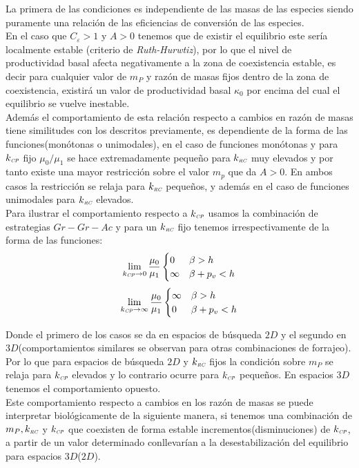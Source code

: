 La primera de las condiciones es independiente de las masas de las especies siendo puramente una relaci\'on de las eficiencias de conversi\'on de las especies. \\
En el caso que $C_\varepsilon > 1 $ y $ A  > 0$ tenemos que de existir el equilibrio este ser\'ia localmente estable (criterio de \emph{Ruth-Hurwtiz}), por lo que el nivel de productividad basal afecta negativamente a la zona de coexistencia estable, es decir para cualquier valor de $m_P$ y raz\'on de masas fijos dentro de la zona de coexistencia, existir\'a un valor de productividad basal $\kappa_0$ por encima del cual el equilibrio se vuelve inestable.\\
Adem\'as el comportamiento de esta relaci\'on respecto a cambios en raz\'on de masas tiene similitudes con los descritos previamente, es dependiente de la forma de las funciones(mon\'otonas o unimodales), en el caso de funciones mon\'otonas y para $k_{\textit{\tiny CP}}$ fijo $\mu_0/\mu_1$ se hace extremadamente peque\~no para $k_{\textit{\tiny RC}}$ muy elevados y por tanto existe una mayor restricci\'on sobre el valor $m_p$ que da $A>0$. En ambos casos la restricci\'on se relaja para $k_{\textit{\tiny RC}}$ peque\~nos, y adem\'as en el caso de funciones unimodales para $k_{\textit{\tiny RC}}$ elevados.\\
Para ilustrar el comportamiento respecto a $k_{\textit{\tiny CP}}$ usamos la combinaci\'on de estrategias $Gr-Gr-Ac$ y para un $k_{\textit{\tiny RC}}$ fijo tenemos irrespectivamente de la forma de las funciones:
\begin{equation}
      \lim_{k_{\textit{\tiny CP}} \to 0} \frac{\mu_0}{\mu_1} 
  \begin{cases}
     0 & \beta > h \\
     \infty & \beta + p_v < h\\ 
  \end{cases}
\end{equation}
\begin{equation}
  \lim_{k_{\textit{\tiny CP}} \to \infty} \frac{\mu_0}{\mu_1}
  \begin{cases}
    \infty & \beta > h\\ 
    0 & \beta + p_v < h\\
    \end{cases}
\end{equation}

Donde el primero de los casos se da en espacios de b\'usqueda $2D$ y el segundo en $3D$(comportamientos similares se observan para otras combinaciones de forrajeo). Por lo que para espacios de b\'usqueda $2D$ y $k_{\textit{\tiny RC}}$ fijos la condici\'on sobre $m_P$ se relaja para $k_{\textit{\tiny CP}}$ elevados y lo contrario ocurre para $k_{\textit{\tiny CP}}$ peque\~nos. En espacios $3D$ tenemos el comportamiento opuesto.\\
Este comportamiento respecto a cambios en los raz\'on de masas se puede interpretar biol\'ogicamente de la siguiente manera, si tenemos una combinaci\'on de $m_P,k_{\textit{\tiny RC}}$ y $k_{\textit{\tiny CP}}$ que coexisten de forma estable incrementos(disminuciones) de $k_{\textit{\tiny CP}}$, a partir de un valor determinado conllevar\'ian a la desestabilizaci\'on del equilibrio para espacios $3D$($2D$).\\

